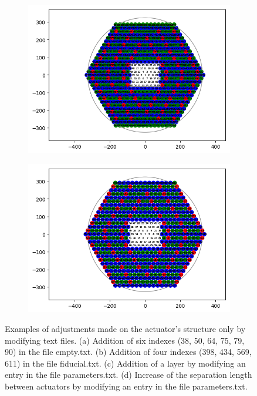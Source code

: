 \begin{figure}[h]\ContinuedFloat
\begin{center}
		\begin{subfigure}{0.85\textwidth}
			\includegraphics[width=\textwidth]{circles/sloan_adding_layer.png}
			\caption{}
		\end{subfigure}
		
		\begin{subfigure}{0.85\textwidth}
			\includegraphics[width=\textwidth]{circles/sloan_adding_separation.png}
			\caption{}
		\end{subfigure}
		\caption{Examples of adjustments made on the actuator's structure only by modifying text files. (a) Addition of six indexes (38, 50, 64, 75, 79, 90) in the file empty.txt. (b) Addition of four indexes (398, 434, 569, 611) in the file fiducial.txt. (c) Addition of a layer by modifying an entry in the file parameters.txt. (d) Increase of the separation length between actuators by modifying an entry in the file parameters.txt.}
		\label{fig:sloan:examples}
	\end{center}
\end{figure}